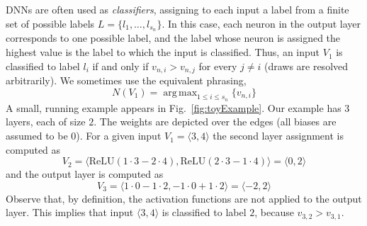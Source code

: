 \documentclass{easychair}
\DeclareMathOperator*{\argmax}{arg\,max}
\newcommand{\relu}{\text{ReLU}\xspace{}}
\begin{document}
DNNs are often used as \emph{classifiers}, assigning to each input a
label from a finite set of possible labels $L=\{l_1,\ldots,l_{s_n}\}$. In this case, each neuron
in the output layer corresponds to one possible label, and the label
whose neuron is assigned the highest value is the label to which the
input is classified. Thus, an input $V_1$ is classified to label $l_i$
if and only if $v_{n,i}>v_{n,j}$ for every $j\neq i$ (draws are
resolved arbitrarily). We sometimes use the equivalent phrasing,
\[
  N(V_1) = \argmax_{1\leq i\leq s_n}\{v_{n,i}\}
\]
A small, running example appears in Fig.~\ref{fig:toyExample}. Our
example has $3$ layers, each of size $2$. The weights are depicted
over the edges (all biases are assumed to be 0). For a given input
$V_1=\langle 3, 4 \rangle$ the second layer assignment is computed as
\[
  V_2=\langle \relu{}(1\cdot 3-2\cdot 4),\relu{}(2\cdot 3-1\cdot
  4)\rangle = \langle 0,2 \rangle
 \]
 and the output layer is computed as
 \[
   V_3= \langle 1 \cdot 0 -1 \cdot 2, -1 \cdot 0 +1  \cdot 2\rangle =
   \langle -2, 2 \rangle
 \]
 Observe that, by definition, the \relu{} activation functions are not applied to the
 output layer. This implies that input $\langle 3, 4\rangle$ is
 classified to label $2$, because $v_{3,2}> v_{3,1}$.
\end{document}
